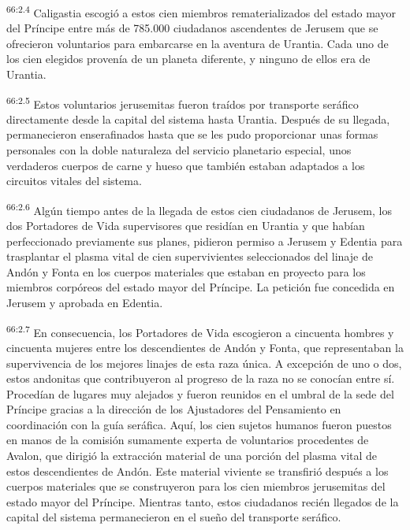 \par
\textsuperscript{66:2.4} Caligastia escogió a estos cien miembros rematerializados del estado mayor del Príncipe entre más de 785.000 ciudadanos ascendentes de Jerusem que se ofrecieron voluntarios para embarcarse en la aventura de Urantia. Cada uno de los cien elegidos provenía de un planeta diferente, y ninguno de ellos era de Urantia.

\par
\textsuperscript{66:2.5} Estos voluntarios jerusemitas fueron traídos por transporte seráfico directamente desde la capital del sistema hasta Urantia. Después de su llegada, permanecieron enserafinados hasta que se les pudo proporcionar unas formas personales con la doble naturaleza del servicio planetario especial, unos verdaderos cuerpos de carne y hueso que también estaban adaptados a los circuitos vitales del sistema.

\par
\textsuperscript{66:2.6} Algún tiempo antes de la llegada de estos cien ciudadanos de Jerusem, los dos Portadores de Vida supervisores que residían en Urantia y que habían perfeccionado previamente sus planes, pidieron permiso a Jerusem y Edentia para trasplantar el plasma vital de cien supervivientes seleccionados del linaje de Andón y Fonta en los cuerpos materiales que estaban en proyecto para los miembros corpóreos del estado mayor del Príncipe. La petición fue concedida en Jerusem y aprobada en Edentia.

\par
\textsuperscript{66:2.7} En consecuencia, los Portadores de Vida escogieron a cincuenta hombres y cincuenta mujeres entre los descendientes de Andón y Fonta, que representaban la supervivencia de los mejores linajes de esta raza única. A excepción de uno o dos, estos andonitas que contribuyeron al progreso de la raza no se conocían entre sí. Procedían de lugares muy alejados y fueron reunidos en el umbral de la sede del Príncipe gracias a la dirección de los Ajustadores del Pensamiento en coordinación con la guía seráfica. Aquí, los cien sujetos humanos fueron puestos en manos de la comisión sumamente experta de voluntarios procedentes de Avalon, que dirigió la extracción material de una porción del plasma vital de estos descendientes de Andón. Este material viviente se transfirió después a los cuerpos materiales que se construyeron para los cien miembros jerusemitas del estado mayor del Príncipe. Mientras tanto, estos ciudadanos recién llegados de la capital del sistema permanecieron en el sueño del transporte seráfico.

